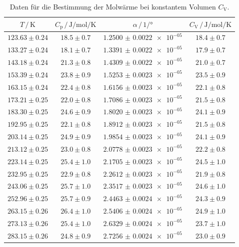 \begin{table}
  \centering
  \caption{Daten für die Bestimmung der Molwärme bei konstantem Volumen $C_\mathrm{V}$.}
  \label{tab:tab2}
  \begin{tabular}{c c c c}
    \toprule
		$T \, / \, \si{\kelvin}$ & $C_\mathrm{p} \, / \, \si{\joule\per\mole\per\kelvin}$ & $\alpha \, / \, \si{1\per\degree}$ & $C_\mathrm{V} \, / \, \si{\joule\per\mole\per\kelvin}$ \\
    \midrule
    $123.63\pm0.24$ & $18.5\pm0.7$ & $\num{1.2500(22)e-05}$ & $18.4\pm0.7$ \\
    $133.27\pm0.24$ & $18.1\pm0.7$ & $\num{1.3391(22)e-05}$ & $17.9\pm0.7$ \\
    $143.18\pm0.24$ & $21.3\pm0.8$ & $\num{1.4309(22)e-05}$ & $21.0\pm0.7$ \\
    $153.39\pm0.24$ & $23.8\pm0.9$ & $\num{1.5253(23)e-05}$ & $23.5\pm0.9$ \\
    $163.15\pm0.24$ & $22.4\pm0.8$ & $\num{1.6156(23)e-05}$ & $22.1\pm0.8$ \\
    $173.21\pm0.25$ & $22.0\pm0.8$ & $\num{1.7086(23)e-05}$ & $21.5\pm0.8$ \\
    $183.30\pm0.25$ & $24.6\pm0.9$ & $\num{1.8020(23)e-05}$ & $24.1\pm0.9$ \\
    $192.95\pm0.25$ & $22.1\pm0.8$ & $\num{1.8912(23)e-05}$ & $21.5\pm0.8$ \\
    $203.14\pm0.25$ & $24.9\pm0.9$ & $\num{1.9854(23)e-05}$ & $24.1\pm0.9$ \\
    $213.12\pm0.25$ & $23.0\pm0.8$ & $\num{2.0778(23)e-05}$ & $22.2\pm0.8$ \\
    $223.14\pm0.25$ & $25.4\pm1.0$ & $\num{2.1705(23)e-05}$ & $24.5\pm1.0$ \\
    $232.95\pm0.25$ & $22.9\pm0.8$ & $\num{2.2612(23)e-05}$ & $21.9\pm0.8$ \\
    $243.06\pm0.25$ & $25.7\pm1.0$ & $\num{2.3517(23)e-05}$ & $24.6\pm1.0$ \\
    $252.96\pm0.25$ & $25.7\pm0.9$ & $\num{2.4463(24)e-05}$ & $24.3\pm0.9$ \\
    $263.15\pm0.26$ & $26.4\pm1.0$ & $\num{2.5406(24)e-05}$ & $24.9\pm1.0$ \\
    $273.13\pm0.26$ & $25.4\pm1.0$ & $\num{2.6329(24)e-05}$ & $23.7\pm1.0$ \\
    $283.15\pm0.26$ & $24.8\pm0.9$ & $\num{2.7256(24)e-05}$ & $23.0\pm0.9$ \\

    \bottomrule
  \end{tabular}
\end{table}

